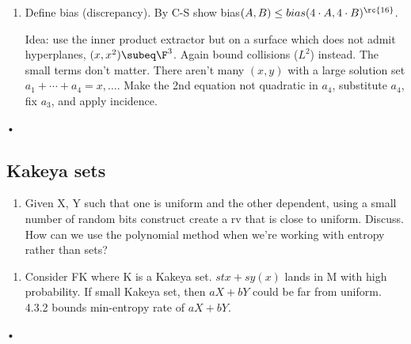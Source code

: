 \begin{enumerate}
\begin{proof}
\begin{enumerate}
Use BSG to find $X_\la,Y_\la$ so that $|X_\la +\la Y_\la|$ small. Find some $\la_0,T'$ so $X_{\la_0}$ has large intersection with $X_{\la}$ for all $\la\in T'$. Use Ruzsa calculus to show $\la_0$ works.
\item Reductions: using Markov and C-S, can assume all $P(\ell)\stackrel{\in}{\approx} (N^{\rc2-2\ep},N^{\rc2+2\ep})$  with $I\ge N^{\fc 32-3\ep}$.
\item Reduce to when $P\subeq A\times B$, $|A|,|B|\le N^{\rc2}$ as follows: by double-counting find $p_0,p_1$ such that there are $\ge N^{1-c\ep}$ points on the intersections of lines through $p_0$ and through $p_1$. Think of $\F^2$ in projective space; apply a transformation to send $p_0\mapsto (1:0:0),p_1\mapsto (0:1:0)$.
\item Count $\{(p_1,p_2,l)\in P\times P\times L\}$ to find 2 $y$-coordinates $y_1,y_2$ for which there are $\ge n^{2-c\ep}$ lines intersecting them both. Restrict to those lines and points. Now find a large set of $y$-coordinates for which there are many points. We get FOR ALL $b\in B'$, that $E(A,\fc{b}{1-b}A)$ is small, contradicting growth in energy.
\end{enumerate}
\end{proof}

\begin{thm}
$A,B,C$ with size in $(p^\al,p^{1-\al})$. Then $|A+BC|>N^{1+\ep(\al)}$.

Proof: Count collisions ($L^2$ norm of $\mu_{A+BC}$), keep only $x$'s with large number of collisions, view as incidence problem.
\end{thm}
\item Define bias (discrepancy). By C-S show bias$(A,B)\le bias(4\cdot A,4\cdot B)^{\rc{16}}$.

Idea: use the inner product extractor but on a surface which does not admit hyperplanes, $(x,x^2)\subeq \F^3$. Again bound collisions ($L^2$) instead. The small terms don't matter. There aren't many $(x,y)$ with a large solution set $a_1+\cdots +a_4=x,\ldots$. Make the 2nd equation not quadratic in $a_4$, substitute $a_4$, fix $a_3$, and apply incidence.
\end{enumerate}•
\subsection{Kakeya sets}
\begin{enumerate}
\item
Given X, Y such that one is uniform and the other dependent, using a small number of random bits construct create a rv that is close to uniform. Discuss. How can we use the polynomial method when we're working with entropy rather than sets?
\end{enumerate}
\begin{enumerate}
\item
Consider  FK where K is a Kakeya set. $stx + sy(x)$ lands in M with high probability.
If small Kakeya set, then $aX+bY$ could be far from uniform.
4.3.2 bounds min-entropy rate of $aX+bY$.
\end{enumerate}•
